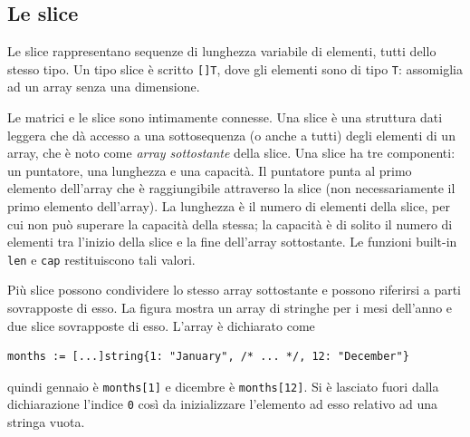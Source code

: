 \documentclass[../../thesis.tex]{subfiles}
\begin{document}
    \subsection{Le slice}\label{subsec:le-slice}
    Le slice rappresentano sequenze di lunghezza variabile di elementi, tutti dello stesso tipo.
    Un tipo slice è scritto \verb"[]T", dove gli elementi sono di tipo \verb"T": assomiglia ad un array senza una dimensione.
    \hfill \vspace{12pt}

    Le matrici e le slice sono intimamente connesse.
    Una slice è una struttura dati leggera che dà accesso a una sottosequenza (o anche a tutti) degli elementi di un array, che è noto come \textit{array sottostante} della slice.
    Una slice ha tre componenti: un puntatore, una lunghezza e una capacità.
    Il puntatore punta al primo elemento dell'array che è raggiungibile attraverso la slice (non necessariamente il primo elemento dell'array).
    La lunghezza è il numero di elementi della slice, per cui non può superare la capacità della stessa;
    la capacità è di solito il numero di elementi tra l'inizio della slice e la fine dell'array sottostante.
    Le funzioni built-in \verb"len" e \verb"cap" restituiscono tali valori.
    \hfill \vspace{12pt}

    Più slice possono condividere lo stesso array sottostante e possono riferirsi a parti sovrapposte di esso.
    La figura mostra un array di stringhe per i mesi dell'anno e due slice sovrapposte di esso.
    L'array è dichiarato come
    \begin{lstlisting}[label={lst:lstlisting3-2.1}]
months := [...]string{1: "January", /* ... */, 12: "December"}
    \end{lstlisting}
    quindi gennaio è \verb"months[1]" e dicembre è \verb"months[12]".
    Si è lasciato fuori dalla dichiarazione l'indice \verb"0" così da inizializzare l'elemento ad esso relativo ad una stringa vuota.
    \hfill \vspace{12pt}
\end{document}
